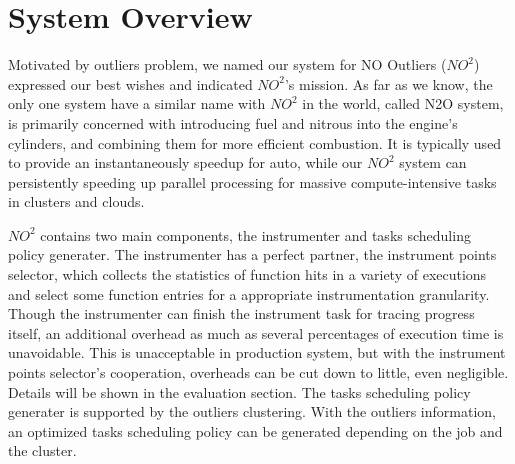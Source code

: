 \section{System Overview}

Motivated by outliers problem, we named our system for NO Outliers ($NO^2$) expressed our best wishes and indicated $NO^2$'s mission. As far as we know, the only one system have a similar name with $NO^2$ in the world, called N2O system, is primarily concerned with introducing fuel and nitrous into the engine's cylinders, and combining them for more efficient combustion. It is typically used to provide an instantaneously speedup for auto, while our $NO^2$ system can persistently speeding up parallel processing for massive compute-intensive tasks in clusters and clouds.

$NO^2$ contains two main components, the instrumenter and tasks scheduling policy generater. The instrumenter has a perfect partner, the instrument points selector, which collects the statistics of function hits in a variety of executions and select some function entries for a appropriate instrumentation granularity. Though the instrumenter can finish the instrument task for tracing progress itself, an additional overhead as much as several percentages of execution time is unavoidable. This is unacceptable in production system, but with the instrument points selector's cooperation, overheads can be cut down to little, even negligible. Details will be shown in the evaluation section. The tasks scheduling policy generater is supported by the outliers clustering. With the outliers information, an optimized tasks scheduling policy can be generated depending on the job and the cluster.

